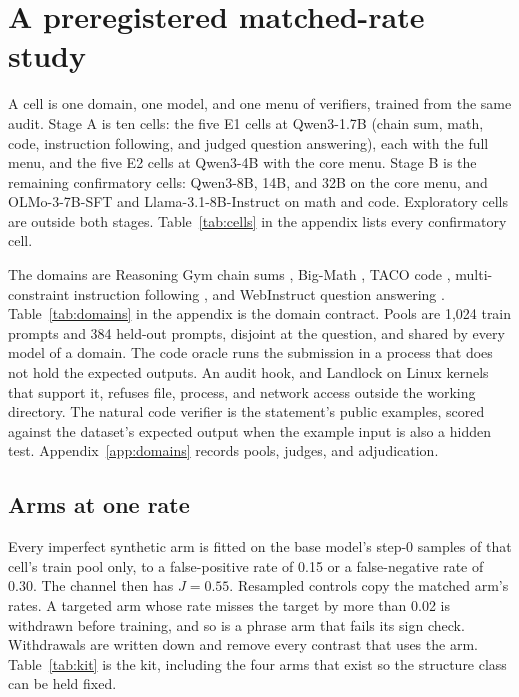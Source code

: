 \section{A preregistered matched-rate study}
\label{sec:study}

A cell is one domain, one model, and one menu of verifiers, trained from the same audit.
Stage A is ten cells: the five E1 cells at Qwen3-1.7B (chain sum, math, code, instruction following, and judged question answering), each with the full menu, and the five E2 cells at Qwen3-4B with the core menu.
Stage B is the remaining confirmatory cells: Qwen3-8B, 14B, and 32B on the core menu, and OLMo-3-7B-SFT and Llama-3.1-8B-Instruct on math and code.
Exploratory cells are outside both stages.
Table~\ref{tab:cells} in the appendix lists every confirmatory cell.

The domains are Reasoning Gym chain sums \citep{stojanovski2025gym}, Big-Math \citep{albalak2025bigmath}, TACO code \citep{li2023taco}, multi-constraint instruction following \citep{pyatkin2025ifbench,lambert2024tulu}, and WebInstruct question answering \citep{ma2025reasoner}.
Table~\ref{tab:domains} in the appendix is the domain contract.
Pools are 1,024 train prompts and 384 held-out prompts, disjoint at the question, and shared by every model of a domain.
The code oracle runs the submission in a process that does not hold the expected outputs.
An audit hook, and Landlock on Linux kernels that support it, refuses file, process, and network access outside the working directory.
The natural code verifier is the statement's public examples, scored against the dataset's expected output when the example input is also a hidden test.
Appendix~\ref{app:domains} records pools, judges, and adjudication.

\subsection{Arms at one rate}

Every imperfect synthetic arm is fitted on the base model's step-0 samples of that cell's train pool only, to a false-positive rate of 0.15 or a false-negative rate of 0.30.
The channel then has $J = 0.55$.
Resampled controls copy the matched arm's rates.
A targeted arm whose rate misses the target by more than 0.02 is withdrawn before training, and so is a phrase arm that fails its sign check.
Withdrawals are written down and remove every contrast that uses the arm.
Table~\ref{tab:kit} is the kit, including the four arms that exist so the structure class can be held fixed.

